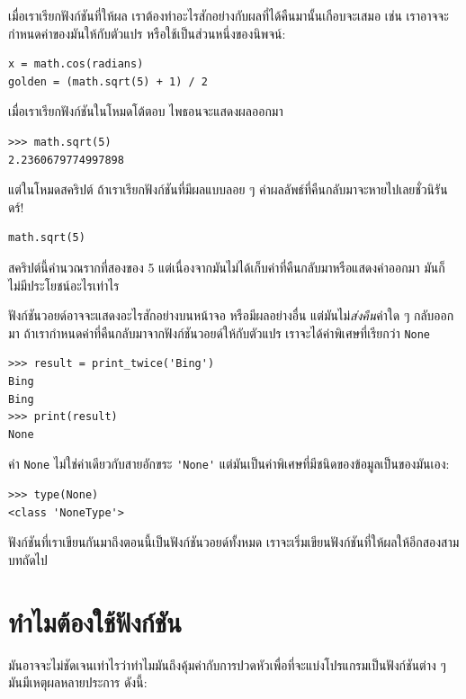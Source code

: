 เมื่อเราเรียกฟังก์ชันที่ให้ผล เราต้องทำอะไรสักอย่างกับผลที่ได้คืนมานั้นเกือบจะเสมอ เช่น 
เราอาจจะกำหนดค่าของมันให้กับตัวแปร หรือใช้เป็นส่วนหนึ่งของนิพจน์:

\begin{verbatim}
x = math.cos(radians)
golden = (math.sqrt(5) + 1) / 2
\end{verbatim}
%
เมื่อเราเรียกฟังก์ชันในโหมดโต้ตอบ ไพธอนจะแสดงผลออกมา

\begin{verbatim}
>>> math.sqrt(5)
2.2360679774997898
\end{verbatim}
%
แต่ในโหมดสคริปต์ ถ้าเราเรียกฟังก์ชันที่มีผลแบบลอย ๆ ค่าผลลัพธ์ที่คืนกลับมาจะหายไปเลยชั่วนิรันดร์!

\begin{verbatim}
math.sqrt(5)
\end{verbatim}
% 
สคริปต์นี้คำนวณรากที่สองของ 5 แต่เนื่องจากมันไม่ได้เก็บค่าที่คืนกลับมาหรือแสดงค่าออกมา มันก็ไม่มีประโยชน์อะไรเท่าไร

ฟังก์ชันวอยด์อาจจะแสดงอะไรสักอย่างบนหน้าจอ หรือมีผลอย่างอื่น แต่มันไม่\textit{ส่งคืน}ค่าใด ๆ กลับออกมา
ถ้าเรากำหนดค่าที่คืนกลับมาจากฟังก์ชันวอยด์ให้กับตัวแปร เราจะได้ค่าพิเศษที่เรียกว่า {\tt None}

\begin{verbatim}
>>> result = print_twice('Bing')
Bing
Bing
>>> print(result)
None
\end{verbatim}
%
ค่า {\tt None} ไม่ใช่ค่าเดียวกับสายอักขระ \verb"'None'" แต่มันเป็นค่าพิเศษที่มีชนิดของข้อมูลเป็นของมันเอง:

\begin{verbatim}
>>> type(None)
<class 'NoneType'>
\end{verbatim}
%
ฟังก์ชันที่เราเขียนกันมาถึงตอนนี้เป็นฟังก์ชันวอยด์ทั้งหมด เราจะเริ่มเขียนฟังก์ชันที่ให้ผลให้อีกสองสามบทถัดไป


\section{ทำไมต้องใช้ฟังก์ชัน} %

มันอาจจะไม่ชัดเจนเท่าไรว่าทำไมมันถึงคุ้มค่ากับการปวดหัวเพื่อที่จะแบ่งโปรแกรมเป็นฟังก์ชันต่าง ๆ
มันมีเหตุผลหลายประการ ดังนี้:

